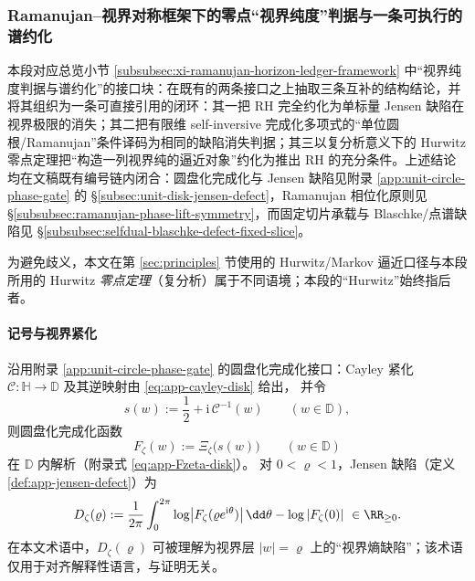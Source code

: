 \subsubsection{Ramanujan--视界对称框架下的零点“视界纯度”判据与一条可执行的谱约化}\label{subsubsec:xi-ramanujan-horizon-purity-spectral-reduction}
本段对应总览小节 \ref{subsubsec:xi-ramanujan-horizon-ledger-framework} 中“视界纯度判据与谱约化”的接口块：在既有的两条接口之上抽取三条互补的结构结论，并将其组织为一条可直接引用的闭环：其一把 RH 完全约化为单标量 Jensen 缺陷在视界极限的消失；其二把有限维 self-inversive 完成化多项式的“单位圆根/Ramanujan”条件译码为相同的缺陷消失判据；其三以复分析意义下的 Hurwitz 零点定理把“构造一列视界纯的逼近对象”约化为推出 RH 的充分条件。上述结论均在文稿既有编号链内闭合：圆盘化完成化与 Jensen 缺陷见附录 \ref{app:unit-circle-phase-gate} 的 \S\ref{subsec:unit-disk-jensen-defect}，Ramanujan 相位化原则见 \S\ref{subsubsec:ramanujan-phase-lift-symmetry}，而固定切片承载与 Blaschke/点谱缺陷见 \S\ref{subsubsec:selfdual-blaschke-defect-fixed-slice}。
\par
为避免歧义，本文在第 \ref{sec:principles} 节使用的 Hurwitz/Markov 逼近口径与本段所用的 Hurwitz \emph{零点定理}（复分析）属于不同语境；本段的“Hurwitz”始终指后者。

\paragraph{记号与视界紧化}
沿用附录 \ref{app:unit-circle-phase-gate} 的圆盘化完成化接口：Cayley 紧化 \(\mathcal{C}:\mathbb{H}\to\mathbb{D}\) 及其逆映射由 \eqref{eq:app-cayley-disk} 给出，
并令
\begin{equation}\label{eq:xi-ramanujan-horizon-s-of-w}
s(w):=\frac12+\mathrm{i}\,\mathcal{C}^{-1}(w)\qquad(w\in\mathbb{D}),
\end{equation}
则圆盘化完成化函数
\begin{equation}\label{eq:xi-ramanujan-horizon-Fzeta}
F_{\zeta}(w):=\Xi_{\zeta}\!\bigl(s(w)\bigr)\qquad(w\in\mathbb{D})
\end{equation}
在 \(\mathbb{D}\) 内解析（附录式 \eqref{eq:app-Fzeta-disk}）。
对 \(0<\varrho<1\)，Jensen 缺陷（定义 \ref{def:app-jensen-defect}）为
\begin{equation}\label{eq:xi-ramanujan-horizon-jensen-defect}
D_{\zeta}(\varrho)
:=\frac{1}{2\pi}\int_{0}^{2\pi}\log\bigl|F_{\zeta}(\varrho e^{\mathrm{i}\theta})\bigr|\,\dd\theta-\log|F_{\zeta}(0)|\ \in\RR_{\ge 0}.
\end{equation}
在本文术语中，\(D_{\zeta}(\varrho)\) 可被理解为视界层 \(|w|=\varrho\) 上的“视界熵缺陷”；该术语仅用于对齐解释性语言，与证明无关。

